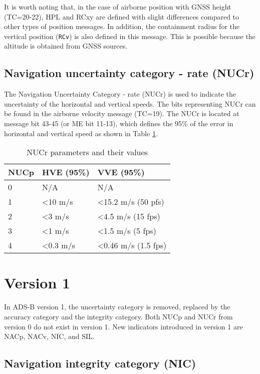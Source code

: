 It is worth noting that, in the case of airborne position with GNSS height (TC=20-22), HPL and RCxy are defined with slight differences compared to other types of position messages. In addition, the containment radius for the vertical position (\texttt{RCv}) is also defined in this message. This is possible because the altitude is obtained from GNSS sources.


\subsection{Navigation uncertainty category - rate (NUCr)}

The Navigation Uncertainty Category - rate (NUCr) is used to indicate the uncertainty of the horizontal and vertical speeds. The bits representing NUCr can be found in the airborne velocity message (TC=19). The NUCr is located at message bit 43-45 (or ME bit 11-13), which defines the 95\% of the error in horizontal and vertical speed as shown in Table \ref{tb:nucr-params}.

\begin{table}[ht]
\caption{NUCr parameters and their values}
\label{tb:nucr-params}
\begin{tabular}{|l|l|l|}
\hline
\textbf{NUCp} & \textbf{HVE (95\%)} & \textbf{VVE (95\%)} \\ \hline
0 & N/A & N/A \\ \hline
1 & \textless 10 m/s & \textless 15.2 m/s (50 pfs) \\ \hline
2 & \textless 3 m/s & \textless 4.5 m/s (15 fps) \\ \hline
3 & \textless 1 m/s & \textless 1.5 m/s (5 fps) \\ \hline
4 & \textless 0.3 m/s & \textless 0.46 m/s (1.5 fps) \\ \hline
\end{tabular}
\end{table}



\section{Version 1}


In ADS-B version 1, the uncertainty category is removed, replaced by the accuracy category and the integrity category. Both NUCp and NUCr from version 0 do not exist in version 1. New indicators introduced in version 1 are NACp, NACv, NIC, and SIL.


\subsection{Navigation integrity category (NIC)}

